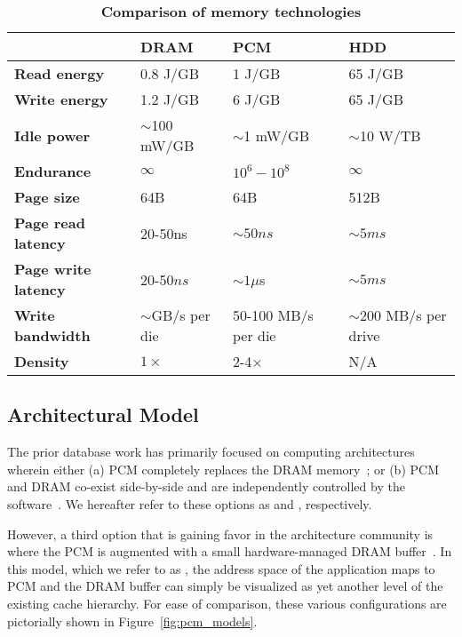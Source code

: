 \begin{table}[!h] 

\caption{\bf Comparison of memory technologies \cite{chen}}
\label{tab:tab_pcm_char} 
\begin{small}
  \begin{tabular}{p{3cm}p{2.5cm}p{3cm}p{3cm}} 
  \toprule
    &  \textbf{DRAM} & \textbf{PCM} &  \textbf{HDD} \\
  \midrule
  \textbf{Read energy} & 0.8 J/GB & 1 J/GB  & 65 J/GB \\
  \textbf{Write energy} & 1.2 J/GB & 6 J/GB  & 65 J/GB \\
  \textbf{Idle power} & $\sim$100 mW/GB & $\sim$1 mW/GB  & $\sim$10 W/TB \\
  \textbf{Endurance} & $\infty$ & $10^6 - 10^8$  & $\infty$ \\
  \textbf{Page size} & 64B & 64B  & 512B \\
  \textbf{Page read latency}& 20-50ns & $\sim50 ns$  & $\sim 5ms$ \\
  \textbf{Page write latency} & 20-50$ns$ & $\sim 1 \mu$s  & $\sim5ms$ \\
  \textbf{Write bandwidth}  & $\sim$GB/s per die & 50-100 MB/s per die  & $\sim$200 MB/s per drive \\
  \textbf{Density} & $1\times$ & 2-4$\times$ & N/A \\
  \bottomrule 
  \end{tabular} 
\end{small} 
\end{table}

\subsection*{Architectural Model}
The prior database work has primarily focused on computing
architectures wherein either (a) PCM completely replaces the
DRAM memory~\cite{chen}; or (b) PCM and DRAM co-exist side-by-side
and are independently controlled by the software~\cite{viglas}. We
hereafter refer to these options as {\bf \modelPcmRam{}} and
{\bf \modelExplicit{}}, respectively.

However, a third option that is gaining favor in the architecture
community is where the PCM is augmented with a small hardware-managed
DRAM buffer~\cite{qureshi}. In this model, which we refer to as
{\bf \model{}}, the address space of the application maps to PCM and the
DRAM buffer can simply be visualized as yet another level of the existing
cache hierarchy.  For ease of comparison, these various configurations
are pictorially shown in Figure~\ref{fig:pcm_models}.


